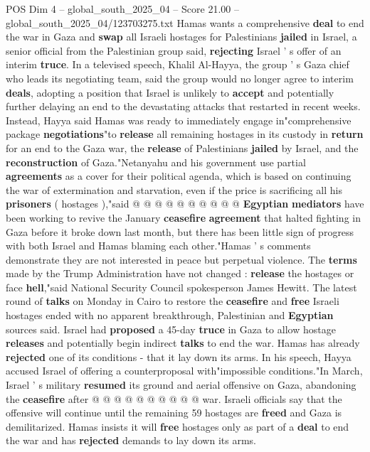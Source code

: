 \begin{textsample}{POS Dim 4 – global\_south\_2025\_04 – Score 21.00 – global\_south\_2025\_04/123703275.txt}  \label{ex:f4_pos_225}
Hamas wants a comprehensive \textbf{deal} to end the war in Gaza and \textbf{swap} all Israeli hostages for Palestinians \textbf{jailed} in Israel, a senior official from the Palestinian group said, \textbf{rejecting} Israel ' s offer of an interim \textbf{truce}.
In a televised speech, Khalil Al-Hayya, the group ' s Gaza chief who leads its negotiating team, said the group would no longer agree to interim \textbf{deals}, adopting a position that Israel is unlikely to \textbf{accept} and potentially further delaying an end to the devastating attacks that restarted in recent weeks.
Instead, Hayya said Hamas was ready to immediately engage in"comprehensive package \textbf{negotiations}"to \textbf{release} all remaining hostages in its custody in \textbf{return} for an end to the Gaza war, the \textbf{release} of Palestinians \textbf{jailed} by Israel, and the \textbf{reconstruction} of Gaza."Netanyahu and his government use partial \textbf{agreements} as a cover for their political agenda, which is based on continuing the war of extermination and starvation, even if the price is sacrificing all his \textbf{prisoners} ( hostages ),"said @ @ @ @ @ @ @ @ @ @ \textbf{Egyptian} \textbf{mediators} have been working to revive the January \textbf{ceasefire} \textbf{agreement} that halted fighting in Gaza before it broke down last month, but there has been little sign of progress with both Israel and Hamas blaming each other."Hamas ' s comments demonstrate they are not interested in peace but perpetual violence.
The \textbf{terms} made by the Trump Administration have not changed : \textbf{release} the hostages or face \textbf{hell},"said National Security Council spokesperson James Hewitt.
The latest round of \textbf{talks} on Monday in Cairo to restore the \textbf{ceasefire} and \textbf{free} Israeli hostages ended with no apparent breakthrough, Palestinian and \textbf{Egyptian} sources said.
Israel had \textbf{proposed} a 45-day \textbf{truce} in Gaza to allow hostage \textbf{releases} and potentially begin indirect \textbf{talks} to end the war.
Hamas has already \textbf{rejected} one of its conditions - that it lay down its arms.
In his speech, Hayya accused Israel of offering a counterproposal with"impossible conditions."In March, Israel ' s military \textbf{resumed} its ground and aerial offensive on Gaza, abandoning the \textbf{ceasefire} after @ @ @ @ @ @ @ @ @ @ war.
Israeli officials say that the offensive will continue until the remaining 59 hostages are \textbf{freed} and Gaza is demilitarized.
Hamas insists it will \textbf{free} hostages only as part of a \textbf{deal} to end the war and has \textbf{rejected} demands to lay down its arms.

\end{textsample}
